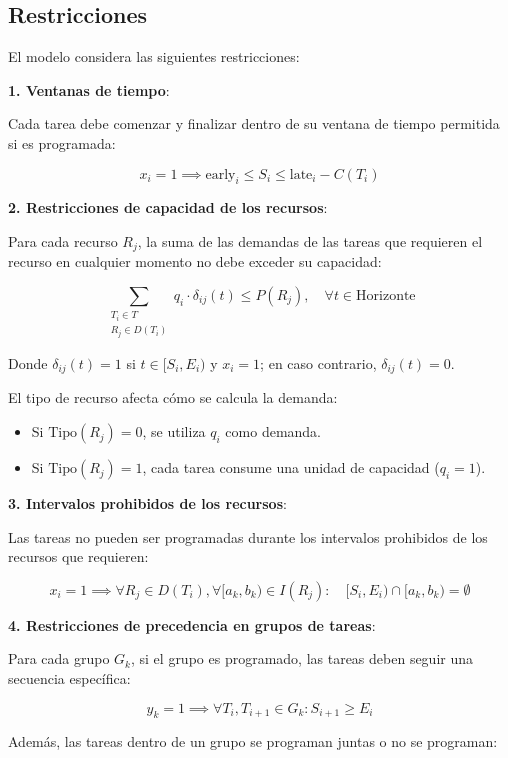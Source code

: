 \documentclass{article}
\begin{document}
\subsection*{Restricciones}

El modelo considera las siguientes restricciones:

\textbf{1. Ventanas de tiempo}:

Cada tarea debe comenzar y finalizar dentro de su ventana de tiempo permitida si es programada:

\[
x_i = 1 \implies \text{early}_i \leq S_i \leq \text{late}_i - C(T_i)
\]

\textbf{2. Restricciones de capacidad de los recursos}:

Para cada recurso \( R_j \), la suma de las demandas de las tareas que requieren el recurso en cualquier momento no debe exceder su capacidad:

\[
\sum_{\substack{T_i \in T \\ R_j \in D(T_i)}} q_i \cdot \delta_{ij}(t) \leq P(R_j), \quad \forall t \in \text{Horizonte}
\]

Donde \( \delta_{ij}(t) = 1 \) si \( t \in [S_i, E_i) \) y \( x_i = 1 \); en caso contrario, \( \delta_{ij}(t) = 0 \).

El tipo de recurso afecta cómo se calcula la demanda:

\begin{itemize}
    \item Si \( \text{Tipo}(R_j) = 0 \), se utiliza \( q_i \) como demanda.
    \item Si \( \text{Tipo}(R_j) = 1 \), cada tarea consume una unidad de capacidad (\( q_i = 1 \)).
\end{itemize}

\textbf{3. Intervalos prohibidos de los recursos}:

Las tareas no pueden ser programadas durante los intervalos prohibidos de los recursos que requieren:

\[
x_i = 1 \implies \forall R_j \in D(T_i), \forall [a_k, b_k) \in I(R_j): \quad [S_i, E_i) \cap [a_k, b_k) = \emptyset
\]

\textbf{4. Restricciones de precedencia en grupos de tareas}:

Para cada grupo \( G_k \), si el grupo es programado, las tareas deben seguir una secuencia específica:

\[
y_k = 1 \implies \forall T_i, T_{i+1} \in G_k: S_{i+1} \geq E_i
\]

Además, las tareas dentro de un grupo se programan juntas o no se programan:
\end{document}
